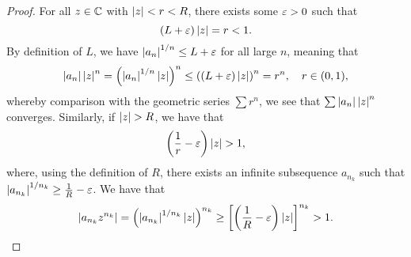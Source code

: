 \begin{proof}
    For all $z \in \mathbb C$ with $\left\lvert z \right\rvert < r < R$, there exists some $\varepsilon > 0$ such that
    \[ (L + \varepsilon)\left\lvert z \right\rvert = r < 1. \]
    By definition of $L$, we have $\left\lvert a_n \right\rvert^{1/n} \leq L + \varepsilon$ for all large $n$, meaning that
    \[ \left\lvert a_n \right\rvert \left\lvert z \right\rvert^n = \left(\left\lvert a_n \right\rvert^{1/n} \left\lvert z \right\rvert\right)^n \leq \left((L + \varepsilon) \left\lvert z \right\rvert\right)^n = r^n, \quad r \in (0, 1), \]
    whereby comparison with the geometric series $\sum r^n$, we see that $\sum \left\lvert a_n \right\rvert \left\lvert z \right\rvert^n$ converges. Similarly, if $\left\lvert z \right\rvert > R$, we have that
    \[ \left(\frac{1}{r} - \varepsilon\right) \left\lvert z \right\rvert > 1, \]
    where, using the definition of $R$, there exists an infinite subsequence $a_{n_k}$ such that $\left\lvert a_{n_k} \right\rvert^{1/n_k} \geq \frac{1}{R} - \varepsilon$. We have that
    \[ \left\lvert a_{n_k} z^{n_k} \right\rvert = \left(\left\lvert a_{n_k} \right\rvert^{1/n_k} \left\lvert z \right\rvert\right)^{n_k} \geq \left[ \left(\frac{1}{R} - \varepsilon\right) \left\lvert z \right\rvert\right]^{n_k} > 1. \qedhere \]
\end{proof}